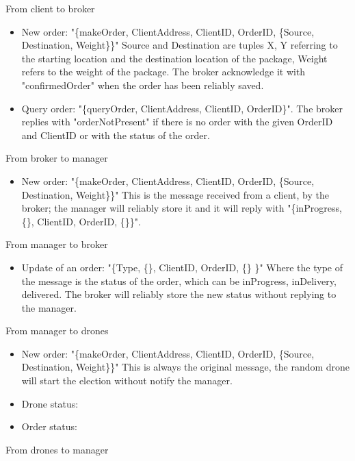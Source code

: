 \documentclass[a4paper, oneside]{memoir}
\begin{document}
From client to broker
\begin{itemize}
	\item New order: "\{makeOrder, ClientAddress, ClientID, OrderID, \{Source, Destination, Weight\}\}"
	Source and Destination are tuples {X, Y} referring to the starting location and the destination location of the package, Weight refers to the weight of the package. The broker acknowledge it with "confirmedOrder" when the order has been reliably saved.

	\item Query order: "\{queryOrder, ClientAddress, ClientID, OrderID\}". The broker replies with "orderNotPresent" if there is no order with the given OrderID and ClientID or with the status of the order.
\end{itemize} \vspace{1em}
From broker to manager
\begin{itemize}
	\item New order: "\{makeOrder, ClientAddress, ClientID, OrderID, \{Source, Destination, Weight\}\}"
	This is the message received from a client, by the broker; the manager will reliably store it and it will reply with "\{inProgress, \{\}, ClientID, OrderID, \{\}\}".
\end{itemize} \vspace{1em}
From manager to broker
\begin{itemize}
	\item Update of an order: "\{Type, \{\}, ClientID, OrderID, \{\} \}"
	Where the type of the message is the status of the order, which can be inProgress, inDelivery, delivered. The broker will reliably store the new status without replying to the manager.
\end{itemize}\vspace{1em}
From manager to drones
\begin{itemize}
	\item New order: "\{makeOrder, ClientAddress, ClientID, OrderID, \{Source, Destination, Weight\}\}"
	This is always the original message, the random drone will start the election without notify the manager.

	\item Drone status:

	\item Order status:
\end{itemize} \vspace{1em}
From drones to manager
\end{document}
